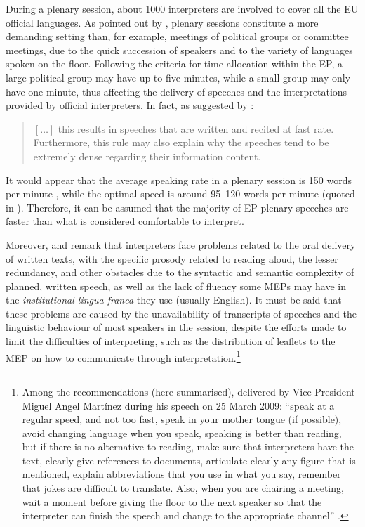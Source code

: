 \documentclass[output=paper]{langscibook}
\begin{document}
During a plenary session, about 1000 interpreters are involved to cover all the EU official languages. As pointed out by \citet{Bartlomiejczyk2016}, plenary sessions constitute a more demanding setting than, for example, meetings of political groups or committee meetings, due to the quick succession of speakers and to the variety of languages spoken on the floor. Following the criteria for time allocation within the EP, a large political group may have up to five minutes, while a small group may only have one minute, thus affecting the delivery of speeches and the interpretations provided by official interpreters. In fact, as suggested by \citet{Vuorikoski2004}:

\begin{quote}
$[\ldots]$ this results in speeches that are written and recited at fast rate. Furthermore, this rule may also explain why the speeches tend to be extremely dense regarding their information content. \citep[79]{Vuorikoski2004}
\end{quote}

It would appear that the average speaking rate in a plenary session is 150 words per minute \citep{MontiEtAl2005}, while the optimal speed is around 95--120 words per minute (quoted in \citealt[52]{Bartlomiejczyk2016}). Therefore, it can be assumed that the majority of EP plenary speeches are faster than what is considered comfortable to interpret.

Moreover, \citet[69]{Marzocchi1998} and \citet[63]{Kent2009} remark that interpreters face problems related to the oral delivery of written texts, with the specific prosody related to reading aloud, the lesser redundancy, and other obstacles due to the syntactic and semantic complexity of planned, written speech, as well as the lack of fluency some MEPs may have in the \textit{institutional lingua franca} they use (usually English). It must be said that these problems are caused by the unavailability of transcripts of speeches and the linguistic behaviour of most speakers in the session, despite the efforts made to limit the difficulties of interpreting, such as the distribution of leaflets to the MEP on how to communicate through interpretation.\footnote{Among the recommendations (here summarised), delivered by Vice-President Miguel Angel Martínez during his speech on 25 March 2009: “speak at a regular speed, and not too fast, speak in your mother tongue (if possible), avoid changing language when you speak, speaking is better than reading, but if there is no alternative to reading, make sure that interpreters have the text, clearly give references to documents, articulate clearly any figure that is mentioned, explain abbreviations that you use in what you say, remember that jokes are difficult to translate. Also, when you are chairing a meeting, wait a moment before giving the floor to the next speaker so that the interpreter can finish the speech and change to the appropriate channel” \citep[55]{Bartlomiejczyk2016}.}
\end{document}

